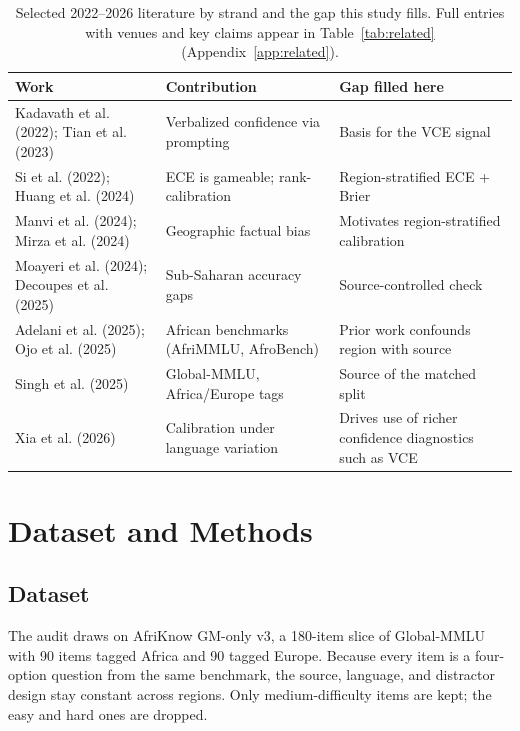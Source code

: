 \documentclass[11pt]{article}
\begin{document}
\begin{table}[t]
\centering
\small
\setlength{\tabcolsep}{3pt}
\begin{tabularx}{\columnwidth}{@{}>{\raggedright\arraybackslash}p{2.4cm}>{\raggedright\arraybackslash}X>{\raggedright\arraybackslash}X@{}}
\toprule
\textbf{Work} & \textbf{Contribution} & \textbf{Gap filled here} \\
\midrule
Kadavath et al. (2022); Tian et al. (2023) & Verbalized confidence via prompting & Basis for the VCE signal \\
Si et al. (2022); Huang et al. (2024) & ECE is gameable; rank-calibration & Region-stratified ECE + Brier \\
Manvi et al. (2024); Mirza et al. (2024) & Geographic factual bias & Motivates region-stratified calibration \\
Moayeri et al. (2024); Decoupes et al. (2025) & Sub-Saharan accuracy gaps & Source-controlled check \\
Adelani et al. (2025); Ojo et al. (2025) & African benchmarks (AfriMMLU, AfroBench) & Prior work confounds region with source \\
Singh et al. (2025) & Global-MMLU, Africa/Europe tags & Source of the matched split \\
Xia et al. (2026) & Calibration under language variation & Drives use of richer confidence diagnostics such as VCE \\
\bottomrule
\end{tabularx}
\caption{Selected 2022--2026 literature by strand and the gap this study fills. Full entries with venues and key claims appear in Table~\ref{tab:related} (Appendix~\ref{app:related}).}
\label{tab:related_summary}
\end{table}


\section{Dataset and Methods}
\label{sec:methods}

\subsection{Dataset}

The audit draws on AfriKnow GM-only v3, a 180-item slice of Global-MMLU \cite{singh2025global} with 90 items tagged Africa and 90 tagged Europe. Because every item is a four-option question from the same benchmark, the source, language, and distractor design stay constant across regions. Only medium-difficulty items are kept; the easy and hard ones are dropped.
\end{document}
